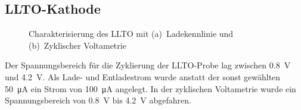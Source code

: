 \documentclass[a4paper, 11pt, headsepline,footsepline,twoside,abstract]{scrbook}
\begin{document}
\subsection{LLTO-Kathode}
\begin{figure}[b!]
   \centering
       \vspace{3mm}
       \vspace{3mm}
	\caption{Charakterisierung des LLTO mit (a)~Ladekennlinie und (b)~Zyklischer Voltametrie}
   	\label{ec_LLTO}
\end{figure}
Der Spannungsbereich für die Zyklierung der LLTO-Probe lag zwischen \SI{0.8}{\volt} und \SI{4.2}{\volt}. Als Lade- und Entladestrom wurde anstatt der sonst gewählten \SI{50}{\micro\ampere} ein Strom von \SI{100}{\micro\ampere} angelegt. In der zyklischen Voltametrie wurde ein Spannungsbereich von \SI{0.8}{\volt} bis \SI{4.2}{\volt} abgefahren.
\end{document}
